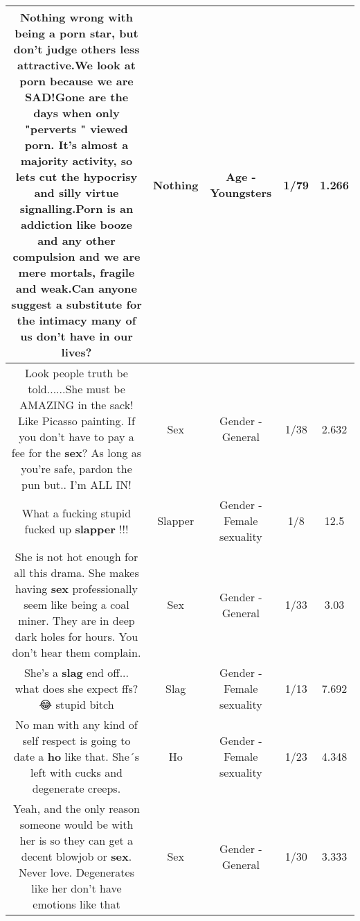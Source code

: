 \documentclass[11pt]{article}
\newlength\mylength
\begin{document}
\begin{center}
\begin{longtable}{|C{.65\mylength}|C{.30\mylength}|C{.12\mylength}|C{.12\mylength}|C{.12\mylength}|}
  \small Nothing wrong with being a porn star, but don't judge others less attractive.We look at porn because we are SAD!Gone are the days when only "perverts " viewed porn. It's almost a majority activity, so lets cut the hypocrisy and silly virtue signalling.Porn is an addiction like booze and any other compulsion and we are mere mortals, fragile and weak.Can anyone suggest a substitute for the intimacy many of us don't have in our lives?\normalsize   & Nothing & Age - Youngsters & 1/79 & 1.266 \\  \hline
  \small Look people truth be told......She must be AMAZING in the sack! Like Picasso painting. If you don't have to pay a fee for the \textbf{sex}? As long as you're safe, pardon the pun but..  I'm ALL IN!\normalsize   & Sex & Gender - General & 1/38 & 2.632 \\  \hline
  \small What a fucking stupid fucked up \textbf{slapper} !!!\normalsize   & Slapper & Gender - Female sexuality & 1/8 & 12.5 \\  \hline
  \small She is not hot enough for all this drama. She makes having \textbf{sex} professionally seem like being a coal miner. They are in deep dark holes for hours. You don't hear them complain.\normalsize   & Sex & Gender - General & 1/33 & 3.03 \\  \hline
  \small She's a \textbf{slag} end off... what does she expect ffs? 😂 stupid bitch\normalsize   & Slag & Gender - Female sexuality & 1/13 & 7.692 \\  \hline
  \small No man with any kind of self respect is going to date a \textbf{ho} like that. She´s left with cucks and degenerate creeps.\normalsize   & Ho & Gender - Female sexuality & 1/23 & 4.348 \\  \hline
  \small Yeah, and the only reason someone would be with her is so they can get a decent blowjob or \textbf{sex}. Never love. Degenerates like her don't have emotions like that\normalsize   & Sex & Gender - General & 1/30 & 3.333 \\  \hline

\end{longtable}
\end{center}
\end{document}
